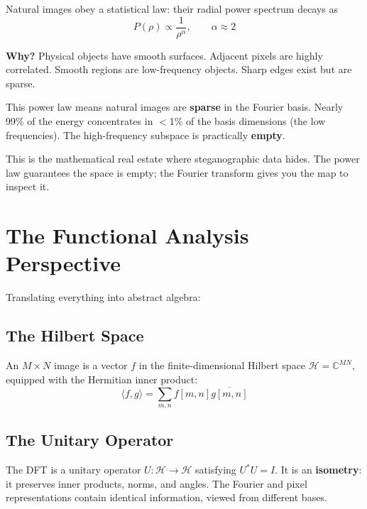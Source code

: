 \documentclass[11pt,a4paper]{article}
\theoremstyle{definition}
\begin{document}
Natural images obey a statistical law: their radial power spectrum decays as
\begin{equation}
    P(\rho) \propto \frac{1}{\rho^\alpha}, \qquad \alpha \approx 2
\end{equation}

\textbf{Why?} Physical objects have smooth surfaces. Adjacent pixels are highly correlated. Smooth regions are low-frequency objects. Sharp edges exist but are sparse.

\begin{insight}
This power law means natural images are \textbf{sparse} in the Fourier basis. Nearly 99\% of the energy concentrates in $<$1\% of the basis dimensions (the low frequencies). The high-frequency subspace is practically \textbf{empty}.

This is the mathematical real estate where steganographic data hides. The power law guarantees the space is empty; the Fourier transform gives you the map to inspect it.
\end{insight}

\section{The Functional Analysis Perspective}

Translating everything into abstract algebra:

\subsection{The Hilbert Space}

An $M \times N$ image is a vector $f$ in the finite-dimensional Hilbert space $\mathcal{H} = \mathbb{C}^{MN}$, equipped with the Hermitian inner product:
\begin{equation}
    \langle f, g \rangle = \sum_{m,n} f[m,n] \overline{g[m,n]}
\end{equation}

\subsection{The Unitary Operator}

The DFT is a unitary operator $U: \mathcal{H} \to \mathcal{H}$ satisfying $U^*U = I$. It is an \textbf{isometry}: it preserves inner products, norms, and angles. The Fourier and pixel representations contain identical information, viewed from different bases.
\end{document}

